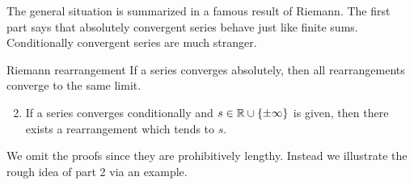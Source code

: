 \goodbreak

The general situation is summarized in a famous result of Riemann. The first part says that absolutely convergent series behave just like finite sums. Conditionally convergent series are much stranger.\footnotemark{}

\begin{thm}{Riemann rearrangement}{}
	\exstart If a series converges absolutely, then all rearrangements converge to the same limit.
	\begin{enumerate}\setcounter{enumi}{1}
	  \item If a series converges conditionally and $s\in\mathbb{R}\cup\{\pm\infty\}$ is given, then there exists a rearrangement which tends to $s$.
	\end{enumerate}
\end{thm}


We omit the proofs since they are prohibitively lengthy. Instead we illustrate the rough idea of part 2 via an example.

